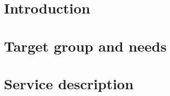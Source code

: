 \documentclass[a4paper,twoside]{report}
\begin{document}
\newcommand{\addTwoImages}[2]{
\begin{tabular}{l l}
    \begin{minipage}{0.4\textwidth}
        \texttt{[image: \#1]} 
    \end{minipage}
& 
    \begin{minipage}{0.4\textwidth}
        \texttt{[image: \#1]} 
    \end{minipage}
\\ 
\end{tabular}
}

\newcommand{\addFourImages}[4]{
\begin{tabular}{l l}
    \begin{minipage}{0.5\textwidth}
        \texttt{[image: \#1]} 
    \end{minipage}
& 
    \begin{minipage}{0.5\textwidth}
        \texttt{[image: \#1]} 
    \end{minipage}
\\ 
    \begin{minipage}{0.5\textwidth}
        \texttt{[image: \#3]} 
    \end{minipage}
&
    \begin{minipage}{0.5\textwidth}
        \texttt{[image: \#4]} 
    \end{minipage}
\\
\end{tabular}
}

\setcounter{secnumdepth}{5}

\setlength{\parindent}{0pt}
\setlength{\parskip}{10pt}

\graphicspath{ {figures/} }

\tableofcontents

\chapter{Introduction}


\chapter{Target group and needs}


\chapter{Service description}

\end{document}
